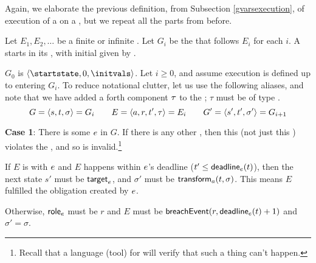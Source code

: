\documentclass[12pt]{article}
\begin{document}
Again, we elaborate the previous definition, from Subsection \ref{gvarsexecution}, of execution of a \Contract on a \trace, but we repeat all the parts from before.

\medskip

Let $E_1, E_2, \dots$ be a finite or infinite \trace. Let $G_i$ be the \GlobalState that follows $E_i$ for each $i$. A \Contract starts in its \startstate, with initial \gvarsassign given by \initvals.

$G_0$ is $\tup{\startstate, 0, \initvals}$.
Let $i \geq 0$, and assume execution is defined up to entering $G_i$. To reduce notational clutter, let us use the following aliases, and note that we have added a forth component $\tau$ to the \Event; $\tau$ must be of type .
\[ G = \langle s,t,\sigma\rangle = G_i  \qquad E = \langle a,r,t',\tau\rangle =  E_i \qquad  G' = \langle s',t', \sigma'\rangle = G_{i+1}\]

{\bf Case 1}: There is some \enabled \mustntran $e$ in $G$. If there is any other \enabled \transition, then this \Contract (not just this \trace) violates the \uaocz, and so is invalid.\footnote{Recall that a language (tool) for \Contracts will verify that such a thing can't happen.}
\begin{PPI}
    \item If $E$ is \compatible with $e$ and $E$ happens within $e$'s deadline ($t' \leq \textsf{deadline}_{e}(t)$), then the next state $s'$ must be $\textsf{target}_{e}$, and $\sigma'$ must be $\textsf{transform}_{a}(t,\sigma)$. This means $E$ fulfilled the obligation created by $e$.
    \item Otherwise, $\textsf{role}_{e}$ must be $r$ and $E$ must be $\textsf{breachEvent}(r,\textsf{deadline}_{e}(t) + 1)$ and $\sigma' = \sigma$. %
\end{PPI}
\end{document}
